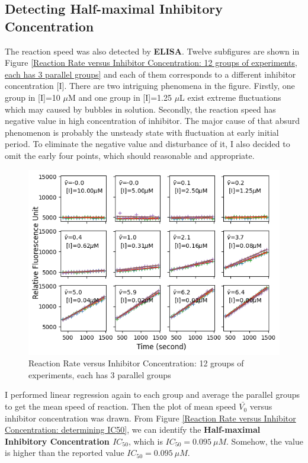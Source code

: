 \documentclass{report}
\begin{document}
\subsection{Detecting Half-maximal Inhibitory Concentration}
The reaction speed was also detected by \textbf{ELISA}.
Twelve subfigures are shown in Figure \ref{Reaction Rate versus Inhibitor Concentration: 12 groups of experiments, each has 3 parallel groups} and each of them corresponds to a different inhibitor concentration [I].
There are two intriguing phenomena in the figure.
Firstly, one group in [I]=10 $\mu$M and one group in [I]=1.25 $\mu$L exist extreme fluctuations which may caused by bubbles in solution.
Secondly, the reaction speed has negative value in high concentration of inhibitor.
The major cause of that absurd phenomenon is probably the unsteady state with fluctuation at early initial period.
To eliminate the negative value and disturbance of it, I also decided to omit the early four points, which should reasonable and appropriate.


\begin{figure}
    \centering
    \includegraphics[width=1\linewidth]{../Figures/inhibitor1.png}
    \caption{Reaction Rate versus Inhibitor Concentration: 12 groups of experiments, each has 3
    parallel groups}
    \label{Reaction Rate versus Inhibitor Concentration: 12 groups of experiments, each has 3
    parallel groups}
\end{figure}

I performed linear regression again to each group and average the parallel groups to get the mean speed of reaction.
Then the plot of mean speed $\bar{V_0}$ versus inhibitor concentration was drawn.
From Figure \ref{Reaction Rate versus Inhibitor Concentration: determining IC50}, we can identify the \textbf{Half-maximal Inhibitory Concentration $IC_{50}$}, which is $IC_{50}=0.095\ \mu M$.
Somehow, the value is higher than the reported value $IC_{50}=0.095\ \mu M$.
\end{document}
